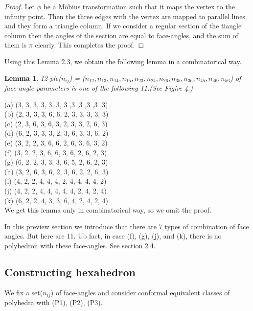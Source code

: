 \documentclass[dvipdfmx]{interact}
\theoremstyle{plain}%
\newtheorem{lemma}[theorem]{Lemma}
\theoremstyle{definition}
\theoremstyle{remark}
\theoremstyle{problemstyle}
\begin{document}
\begin{proof}
 Let $\phi$ be a M\"obius transformation such that it maps the vertex to
 the infinity point. Then the three edges with the vertex are mapped to
 parallel lines and they form a triangle column. If we consider a
 regular section of the tiangle column then the angles of the section
 are equal to face-angles, and the sum of them is $\pi$ clearly. This
 completes the proof.
\end{proof}

 Using this Lemma 2.3, we obtain the following lemma in a combinatorical way.

\begin{lemma}
 12-ple($n_{ij}$) = ($n_{12}, n_{13}, n_{14}, n_{15}, n_{23}, n_{24},
 n_{26}, n_{35}, n_{36}, n_{45}, n_{46}, n_{56}$) of face-angle
 parameters is one of the following 11.(See Figire 4.)
\end{lemma}

\noindent(a) (3, 3, 3, 3, 3, 3, 3 ,3 ,3 ,3 ,3 ,3)\\
(b) (2, 3, 3, 3, 6, 6, 2, 3, 3, 3, 3, 3)\\
(c) (2, 3, 6, 3, 6, 3, 2, 3, 3, 2, 6, 3)\\
(d) (6, 2, 3, 3, 3, 2, 3, 6, 3, 3, 6, 2)\\
(e) (3, 2, 2, 3, 6, 6, 2, 6, 3, 6, 3, 2)\\
(f) (3, 2, 2, 3, 6, 6, 3, 6, 2, 6, 2, 3)\\
(g) (6, 2, 2, 3, 3, 3, 6, 5, 2, 6, 2, 3)\\
(h) (3, 2, 6, 3, 6, 2, 3, 6, 2, 2, 6, 3)\\
(i) (4, 2, 2, 4, 4, 4, 2, 4, 4, 4, 4, 2)\\
(j) (4, 2, 2, 4, 4, 4, 4, 4, 2, 4, 2, 4)\\
(k) (6, 2, 2, 4, 3, 3, 6, 4, 2, 4, 2, 4)\\


We get this lemma only in combinatorical way, so we omit the proof.

In this preview section we introduce that there are 7 types of
combination of face angles. But here are 11. Ub fact, in case (f), (g),
(j), and (k), there is no polyhedron with these face-angles. See section 2.4.

\subsection{Constructing hexahedron}

We fix a set($n_{ij}$) of face-angles and consider conformal equivalent
classes of polyhedra with (P1), (P2), (P3).
\end{document}
